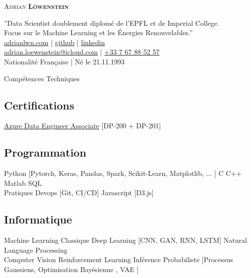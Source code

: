 \documentclass{article}
\newcommand{\longdescript}[1]{\color{subheadings}\normalfont\small {#1\\} }
\newcommand{\sectionsep}[0]{\vspace{-6pt}}
\newcommand{\namesection}[4]{
	\begin{center}
		\sffamily
		\headingfont\fontsize{35pt}{14pt}\selectfont\scshape #1 
			\headingfont\selectfont\scshape\bfseries #2
	\end{center}
	\vspace{-14pt}
		\begin{center} \color{subheadings}\normalfont\fontsize{11pt}{14pt}\selectfont #3
		\end{center}
	
	\vspace{-5pt}
	}
\newcommand{\mybullet}[1]{ \hspace{2pt}\textbullet{#1}\hspace{2pt} }
\begin{document}

\namesection{Adrian}{Löwenstein}{ ''Data Scientist doublement diplomé de l'EPFL et de Imperial College. \\ Focus sur le Machine Learning et les Énergies Renouvelables.'' \\\vspace*{8pt}  \href{https://www.adrianlwn.com}{\faGlobe{} adrianlwn.com} | \href{https://github.com/adrianlwn}{\faGithubSquare{}  github}  | \href{https://www.linkedin.com/in/adrianloewenstein}{\faLinkedinSquare{}  linkedin} \\ \href{mailto:adrian.loewenstein@icloud.com}{\faEnvelope{} adrian.loewenstein@icloud.com} |  \href{tel:+33767885257}{\faPhoneSquare{} +33 7 67 88 52 57}  \\ Nationalité Française | Né le 21.11.1993 
 }





\section{Compétences Techniques}

\subsection{Certifications} 
\longdescript{\href{https://www.youracclaim.com/badges/b73a0c9c-6fdd-4d60-8df4-4297c0ebfe3f}{Azure Data Engineer Associate} [DP-200 + DP-201]
}
\sectionsep

\subsection{Programmation}
\longdescript{Python [Pytorch, Keras, Pandas, Spark, Scikit-Learn, Matplotlib, ... ] \mybullet{} C \mybullet{} C++ \mybullet{} Matlab \mybullet{} SQL \\ \hspace*{3pt} Pratiques Devops [Git, CI/CD] \mybullet{} Javascript [D3.js]}
\sectionsep

\subsection{Informatique} 
\longdescript{ Machine Learning Classique \mybullet{} Deep Learning [CNN, GAN, RNN, LSTM] \mybullet{} Natural Language Processing  \\ \hspace*{3pt} Computer Vision \mybullet{} Reinforcement Learning  \mybullet{} Inférence Probabiliste [Processus Gaussiens, Optimisation Bayésienne , VAE ]   } 
\sectionsep
\end{document}
